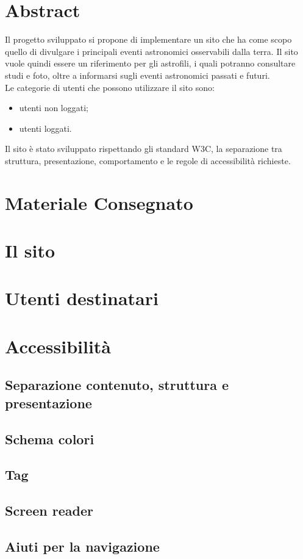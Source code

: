 \section{Abstract}
Il progetto sviluppato si propone di implementare un sito che ha come scopo quello di divulgare i principali eventi astronomici osservabili dalla terra.
Il sito vuole quindi essere un riferimento per gli astrofili, i quali potranno consultare studi e foto, oltre a informarsi sugli eventi astronomici passati e futuri. \\
Le categorie di utenti che possono utilizzare il sito sono:
\begin{itemize}
	\item utenti non loggati;
	\item utenti loggati.
\end{itemize}
Il sito è stato sviluppato rispettando gli
standard W3C, la separazione tra struttura, presentazione, comportamento
e le regole di accessibilità richieste.

\section{Materiale Consegnato}
\section{Il sito}
\section{Utenti destinatari}
\section{Accessibilità}
 \subsection{Separazione contenuto, struttura e presentazione}
 \subsection{Schema colori}
 \subsection{Tag}
 \subsection{Screen reader}
 \subsection{Aiuti per la navigazione}

